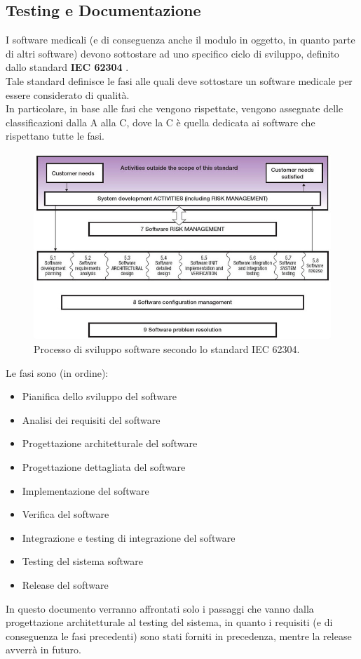 \documentclass[\main/tesi.tex]{subfiles}
\begin{document}
\subsection{Testing e Documentazione}
\label{testing}
I software medicali (e di conseguenza anche il modulo in oggetto, in quanto parte di altri software) devono sottostare ad uno specifico ciclo di sviluppo, definito dallo standard \textbf{IEC 62304} \cite{iec62304}.\\
Tale standard definisce le fasi alle quali deve sottostare un software medicale per essere considerato di qualità.\\
In particolare, in base alle fasi che vengono rispettate, vengono assegnate delle classificazioni dalla A alla C, dove la C è quella dedicata ai software che rispettano tutte le fasi.\\
\begin{figure}[h]
    \caption{Processo di sviluppo software secondo lo standard IEC 62304.}
    \includegraphics[width=\textwidth]{../images/quality.png}
\end{figure}
Le fasi sono (in ordine):
\begin{itemize}
    \item Pianifica dello sviluppo del software
    \item Analisi dei requisiti del software
    \item Progettazione architetturale del software
    \item Progettazione dettagliata del software
    \item Implementazione del software
    \item Verifica del software
    \item Integrazione e testing di integrazione del software
    \item Testing del sistema software
    \item Release del software
\end{itemize}
In questo documento verranno affrontati solo i passaggi che vanno dalla progettazione architetturale al testing del sistema, in quanto i requisiti (e di conseguenza le fasi precedenti) sono stati forniti in precedenza, mentre la release avverrà in futuro.\\
\end{document}
